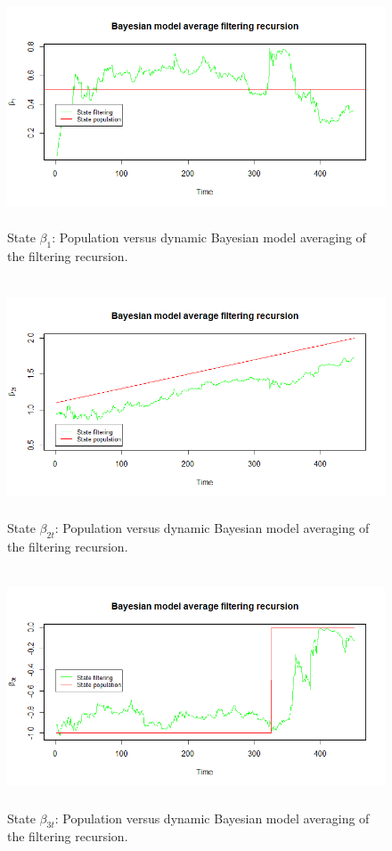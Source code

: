 \begin{figure}[!h]
	\includegraphics[width=340pt, height=200pt]{Chapters/chapter10/figures/figPMPdbma1.png}
	\caption[List of figure caption goes here]{State $\beta_{1}$: Population versus dynamic Bayesian model averaging of the filtering recursion.}\label{figPMPdbma1}
\end{figure}

\begin{figure}[!h]
	\includegraphics[width=340pt, height=200pt]{Chapters/chapter10/figures/figPMPdbma2.png}
	\caption[List of figure caption goes here]{State $\beta_{2t}$: Population versus dynamic Bayesian model averaging of the filtering recursion.}\label{figPMPdbma2}
\end{figure}

\begin{figure}[!h]
	\includegraphics[width=340pt, height=200pt]{Chapters/chapter10/figures/figPMPdbma3.png}
	\caption[List of figure caption goes here]{State $\beta_{3t}$: Population versus dynamic Bayesian model averaging of the filtering recursion.}\label{figPMPdbma3}
\end{figure}

